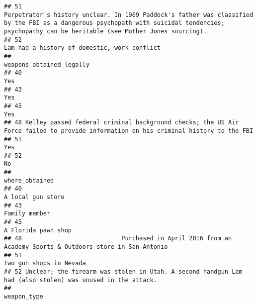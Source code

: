 \documentclass[
]{article}
\begin{document}
\begin{verbatim}
## 51                                                                                                                                                                                        Perpetrator's history unclear. In 1969 Paddock's father was classified by the FBI as a dangerous psychopath with suicidal tendencies; psychopathy can be heritable (see Mother Jones sourcing). 
## 52                                                                                                                                                                                                                                                                                                                                            Lam had a history of domestic, work conflict
##                                                                                                               weapons_obtained_legally
## 40                                                                                                                                 Yes
## 43                                                                                                                                 Yes
## 45                                                                                                                                 Yes
## 48 Kelley passed federal criminal background checks; the US Air Force failed to provide information on his criminal history to the FBI
## 51                                                                                                                                 Yes
## 52                                                                                                                                  No
##                                                                                               where_obtained
## 40                                                                                         A local gun store
## 43                                                                                             Family member
## 45                                                                                       A Florida pawn shop
## 48                            Purchased in April 2016 from an Academy Sports & Outdoors store in San Antonio
## 51                                                                                   Two gun shops in Nevada
## 52 Unclear; the firearm was stolen in Utah. A second handgun Lam had (also stolen) was unused in the attack.
##                                                                                                                 weapon_type

\end{verbatim}
\end{document}
